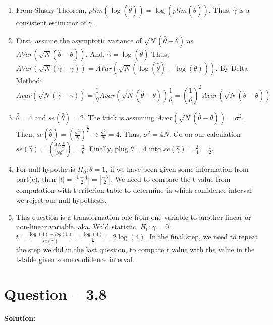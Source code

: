 \documentclass[11pt]{article} %
\begin{document}
\begin{enumerate}
    \item From Slusky Theorem, $plim(\log(\hat{\theta}))=\log(plim(
        \hat{\theta}))$. Thus, $\hat{\gamma}$ is a consistent estimator of $\gamma$.
    \item First, assume the asymptotic variance of $\sqrt{N}(\hat{\theta}-\theta)$ as 
        $AVar(\sqrt{N}(\hat{\theta}-\theta))$. And, $\hat{\gamma}=
        \log(\hat{\theta})$ Thus, $AVar(\sqrt{N}(\hat{\gamma}-\gamma))=
        AVar(\sqrt{N}(\log(\hat{\theta})-\log(\theta)))$. By Delta Method:
        \begin{equation*}
            Avar(\sqrt{N}(\hat{\gamma}-\gamma))=\frac{1}{\theta}Avar(\sqrt{N}(\hat{\theta}-\theta))\frac{1}{\theta}=(\frac{1}{\theta})^2 Avar(\sqrt{N}(\hat{\theta}-\theta))
        \end{equation*}
    \item  $\hat{\theta}=4$ and $se(\hat{\theta})=2$. The trick is assuming $Avar(\sqrt{N}(\hat{\theta}-\theta))=\sigma^2$,
        Then, $se(\hat{\theta})=(\frac{\sigma^2}{N})^{\frac{1}{2}} \longrightarrow \frac{\sigma^2}{N}=4$. Thus, $\sigma^2=4N$. 
        Go on our calculation $se(\hat{\gamma})=(\frac{4N\frac{1}{\theta^2}}{N\theta^2})=\frac{2}{\theta}$.
        Finally, plug $\theta=4$ into $se(\hat{\gamma})=\frac{2}{4}=\frac{1}{2}$.
    \item For null hypothesis $H_0:\theta=1$, if we have been given some information from part(c), then $|t|=|\frac{1-4}{2}|=|\frac{-3}{2}|$. We need to compare the t value from computation with t-criterion table to determine in which confidence interval we reject our null hypothesis.
    \item This question is a transformation one from one variable to another linear or non-linear variable, aka, Wald statistic. $H_0: \gamma=0$. $t=\frac{\log(4)-log(1)}{se(\hat{\gamma})}=\frac{\log(4)}{\frac{1}{2}}=2\log(4)$. In the final step, we need to repeat the step we did in the last question, to compare t value with the value in the t-table given some confidence interval. 
\end{enumerate}




\section{Question -- 3.8}
\textbf{Solution:}
\end{document}
